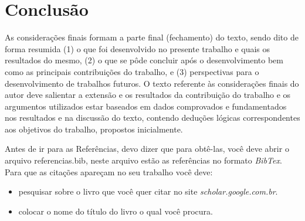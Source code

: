 \chapter{Conclusão}

As considerações finais formam a parte final (fechamento) do texto, sendo dito de forma resumida (1) o que foi desenvolvido no presente trabalho e quais os resultados do mesmo, (2) o que se pôde concluir após o desenvolvimento bem como as principais contribuições do trabalho, e (3) perspectivas para o desenvolvimento de trabalhos futuros. O texto referente às considerações finais do autor deve salientar a extensão e os resultados da contribuição do trabalho e os argumentos utilizados estar baseados em dados comprovados e fundamentados nos resultados e na discussão do texto, contendo deduções lógicas correspondentes aos objetivos do trabalho, propostos inicialmente.

Antes de ir para as Referências, devo dizer que para obtê-las, você deve abrir o arquivo referencias.bib, neste arquivo estão as referências no formato \textit{BibTex}. Para que as citações apareçam no seu trabalho você deve:
\begin{itemize}
	\item pesquisar sobre o livro que você quer citar no site \textit{scholar.google.com.br}.
	\item colocar o nome do título do livro o qual você procura.
\end{itemize}
